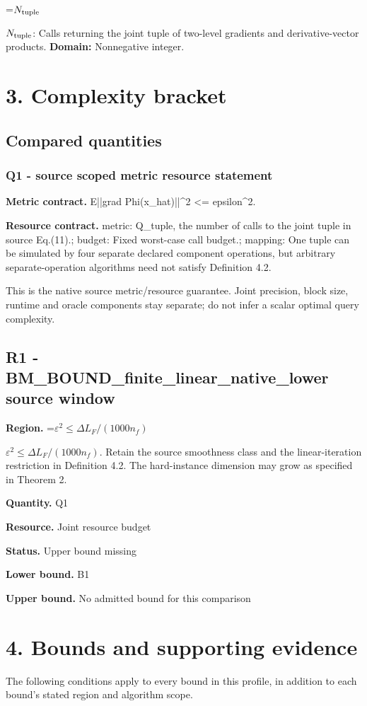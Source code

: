 \documentclass[10pt,a4paper]{article}
\newcommand{\AtlasMath}[1]{\par\begingroup\centering\setbox0=\hbox{$\displaystyle #1$}\ifdim\wd0>1.4\linewidth\typeout{ATLAS WIDE FORMULA: \the\wd0}\fi\ifdim\wd0>\linewidth\resizebox{\linewidth}{!}{\box0}\else\box0\fi\par\endgroup}
\newcommand{\AtlasInlineMath}[1]{\begingroup\setbox0=\hbox{$#1$}\ifdim\wd0>.4\linewidth\endgroup\AtlasMath{#1}\else\endgroup$#1$\fi}
\begin{document}
\AtlasInlineMath{N_{\rm tuple}}: Calls returning the joint tuple of two-level gradients and derivative-vector products. \textbf{Domain:} Nonnegative integer.

\section{3. Complexity bracket}
\subsection{Compared quantities}
\subsubsection{Q1 - source scoped metric resource statement}
\textbf{Metric contract.} E||grad Phi(x\_hat)||\textasciicircum{}2 <= epsilon\textasciicircum{}2.

\textbf{Resource contract.} metric: Q\_tuple, the number of calls to the joint tuple in source Eq.(11).; budget: Fixed worst-case call budget.; mapping: One tuple can be simulated by four separate declared component operations, but arbitrary separate-operation algorithms need not satisfy Definition 4.2.

This is the native source metric/resource guarantee. Joint precision, block size, runtime and oracle components stay separate; do not infer a scalar optimal query complexity.

\subsection{R1 - BM\_BOUND\_finite\_linear\_native\_lower source window}
\textbf{Region.} \AtlasInlineMath{\varepsilon^2\le\Delta L_F/(1000n_f)}. Retain the source smoothness class and the linear-iteration restriction in Definition 4.2. The hard-instance dimension may grow as specified in Theorem 2.

\textbf{Quantity.} Q1

\textbf{Resource.} Joint resource budget

\textbf{Status.} Upper bound missing

\textbf{Lower bound.} B1

\textbf{Upper bound.} No admitted bound for this comparison

\section{4. Bounds and supporting evidence}
The following conditions apply to every bound in this profile, in addition to each bound's stated region and algorithm scope.
\end{document}
